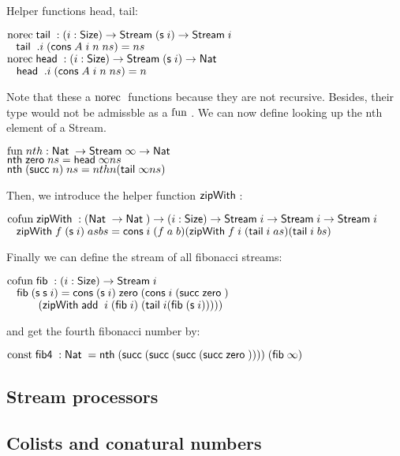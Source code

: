 Helper functions head, tail:
\begin{bsp}
$\norec \tail : \EPi{i}{\Size}\Stream (\s i) \ra \Stream i$\\
$\spc \tail \; .i \; (\cons A \; i \; n \; ns) = ns$\\
$\norec \head : \EPi{i}{\Size}\Stream (\s i) \ra \Nat$\\
$\spc \head \; .i \; (\cons A \; i \; n \; ns) = n$
\end{bsp}
Note that these a $\norec$ functions because they are not recursive. Besides, their type would not be admissble as a $\fun$.
We can now define looking up the nth element of a Stream.
\begin{bsp}
$\fun nth : \Nat \ra \Stream \infty \ra \Nat$\\
$\nth \zero ns = \head \infty ns$\\
$\nth (\suc n) \; ns = nth n (\tail \infty ns)$\\
\end{bsp}
Then, we introduce the helper function $\zipWith$:
\begin{bsp}
$\cofun \zipWith : (\Nat \ra \Nat ) \ra \EPi{i}{\Size}{\Stream i \ra \Stream i \ra \Stream i}$ \\
$\spc \zipWith f \; (\s i) \; as bs = \cons i \; (f \; a \; b) (\zipWith f \; i \; (\tail i \; as) (\tail i \; bs)$
\end{bsp}
Finally we can define the stream of all fibonacci streams:
\begin{bsp}
$\cofun \fib : \EPi{i}{\Size}\Stream i$\\
$\spc \fib (\s \s i) = \cons (\s i) \; \zero (\cons i \; (\suc \zero)$\\
$\spcx (\zipWith \add \; i \; (\fib i) \; (\tail i (\fib (\s i)))))$
\end{bsp}
and get the fourth fibonacci number by:
\begin{bsp}
$\const \fibf : \Nat = \nth (\suc (\suc (\suc (\suc \zero )))) \; (\fib \infty)$
\end{bsp}
\subsection{Stream processors}
\subsection{Colists and conatural numbers}
